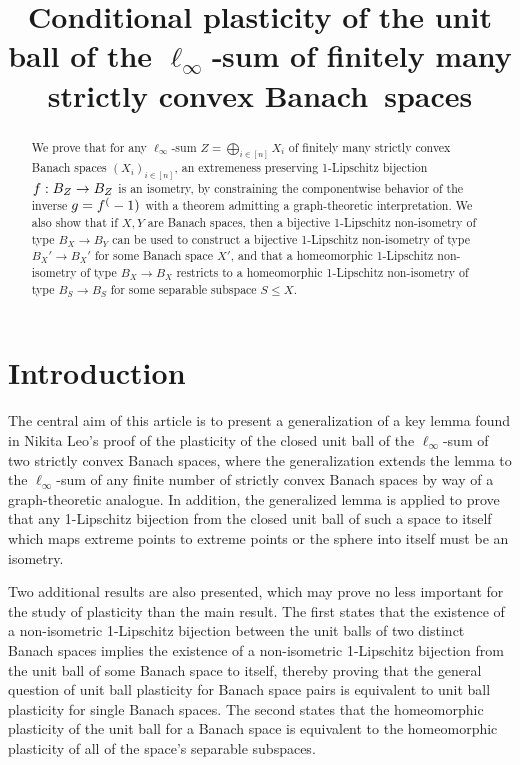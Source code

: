 \documentclass{amsart}
\title{Conditional plasticity of the unit ball of the \(\ell_\infty\)‑sum of finitely many strictly convex Banach~spaces}
\theoremstyle{definition}
\begin{document}
\begin{abstract}
    We prove that for any $\ell_\infty$-sum $Z = \bigoplus_{i \in [n]} X_i$ of finitely many strictly
    convex Banach spaces $(X_i)_{i \in [n]}$, an extremeness preserving 1-Lipschitz bijection
    $f: B_Z \to B_Z$ is an isometry, by constraining the componentwise behavior of the inverse
    $g=f^(-1)$ with a theorem admitting a graph-theoretic interpretation.
    We also show that if $X, Y$ are Banach spaces, then a bijective 1-Lipschitz non-isometry of
    type $B_X \to B_Y$ can be used to construct a bijective 1-Lipschitz non-isometry of type
    $B_X' \to B_X'$ for some Banach space $X'$, and that a homeomorphic 1-Lipschitz non-isometry of
    type $B_X \to B_X$ restricts to a homeomorphic 1-Lipschitz non-isometry of type
    $B_S \to B_S$ for some separable subspace $S \leq X$.
\end{abstract}

\maketitle

\section{Introduction}

The central aim of this article is to present a generalization of a key lemma
found in Nikita Leo's proof of the plasticity of the closed unit ball of
the $\ell_\infty$-sum of two strictly convex Banach spaces, where the generalization
extends the lemma to the $\ell_\infty$-sum of any finite number of strictly convex Banach
spaces by way of a graph-theoretic analogue. In addition, the generalized lemma is applied to prove that any 1-Lipschitz bijection from
the closed unit ball of such a space to itself
which maps extreme points to extreme points
or the sphere into itself must be an isometry.

Two additional results are also presented, which may prove no less important for the study of plasticity than the main result. The first states that the existence of a non-isometric 1-Lipschitz bijection between the unit balls of two distinct Banach spaces implies the existence of a non-isometric 1-Lipschitz bijection from the unit ball of some Banach space to itself, thereby proving that the general question of unit ball plasticity for Banach space pairs is equivalent to unit ball plasticity for single Banach spaces. The second states that the homeomorphic plasticity of the unit ball for a Banach space is equivalent to the homeomorphic plasticity of all of the space's separable subspaces.
\end{document}
